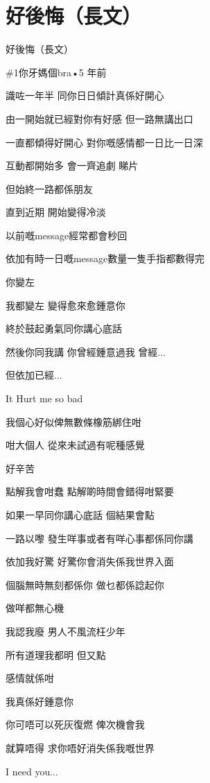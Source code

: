 \chapter{好後悔（長文）}

好後悔（長文）

\#1你牙媽個bra•5 年前

識咗一年半 同你日日傾計真係好開心

由一開始就已經對你有好感 但一路無講出口

一直都傾得好開心 對你嘅感情都一日比一日深

互動都開始多 會一齊追劇 睇片

但始終一路都係朋友

直到近期 開始變得冷淡

以前嘅message經常都會秒回

依加有時一日嘅message數量一隻手指都數得完

你變左

我都變左 變得愈來愈鍾意你

終於鼓起勇氣同你講心底話

然後你同我講 你曾經鍾意過我 曾經...

但依加已經...

It Hurt me so bad

我個心好似俾無數條橡筋綁住咁

咁大個人 從來未試過有呢種感覺

好辛苦

點解我會咁蠢 點解啲時間會錯得咁緊要

如果一早同你講心底話 個結果會點

一路以嚟 發生咩事或者有咩心事都係同你講

依加我好驚 好驚你會消失係我世界入面

個腦無時無刻都係你 做乜都係諗起你

做咩都無心機

我認我廢 男人不風流枉少年

所有道理我都明 但又點

感情就係咁

我真係好鍾意你

你可唔可以死灰復燃 俾次機會我

就算唔得 求你唔好消失係我嘅世界

I need you...

